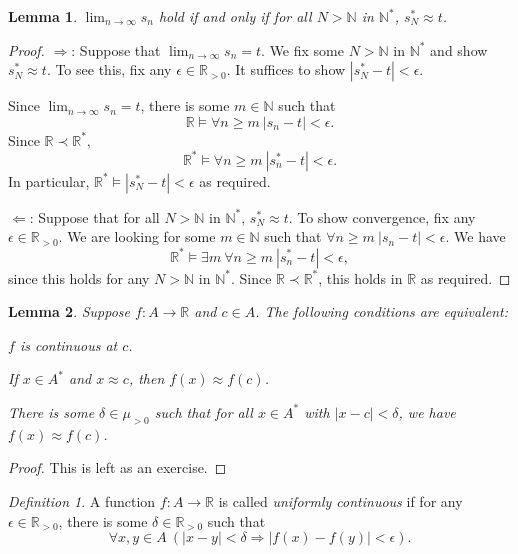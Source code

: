 \documentclass[a4paper, 11pt]{amsart}
\newtheorem{lemma}[lemma]{Lemma}
\theoremstyle{remark}
\newtheorem{definition}[definition]{Definition}
\newcommand{\NN}{\mathbb{N}}
\newcommand{\RR}{\mathbb{R}}
\newenvironment{enumerate-(1)}{\begin{enumerate}[label={\upshape (\arabic*)}, leftmargin=2pc]}{\end{enumerate}}
\begin{document}
\begin{lemma} 
$\lim_{n\rightarrow \infty} s_n$ hold if and only if for all $N>\NN$ in $\NN^*$, $s^*_N\approx t$. 
\end{lemma} 
\begin{proof} 
$\Longrightarrow$: 
Suppose that $\lim_{n\rightarrow \infty} s_n=t$. 
We fix some $N>\NN$ in $\NN^*$ and show $s^*_N\approx t$. 
To see this, fix any $\epsilon \in \RR_{>0}$. 
It suffices to show $|s^*_N-t|<\epsilon$. 

Since $\lim_{n\rightarrow \infty} s_n=t$, there is some $m\in \NN$ such that 
$$ \RR \models \forall n\geq m\ |s_n-t|<\epsilon. $$ 
Since $\RR\prec \RR^*$, 
$$ \RR^* \models \forall n\geq m\ |s^*_n-t|<\epsilon. $$  
In particular, $ \RR^* \models  |s^*_N-t|<\epsilon$ as required. 

$\Longleftarrow$:  
Suppose that for all $N>\NN$ in $\NN^*$, $s^*_N\approx t$. 
To show convergence, fix any $\epsilon \in \RR_{>0}$. 
We are looking for some $m\in \NN$ such that  $ \forall n\geq m\ |s_n -t| <\epsilon $. 
We have 
$$  \RR^* \models  \exists m\ \forall n\geq m\ |s^*_n-t| <\epsilon , $$
since this holds for any $N>\NN$ in $\NN^*$. 
Since $\RR\prec \RR^*$, this holds in $\RR$ as required. 
\end{proof} 


\begin{lemma} 
\label{characterisation of continuity} 
Suppose $f\colon A\rightarrow \RR$ and $c\in A$. 
The following conditions are equivalent: 
\begin{enumerate-(1)} 
\item 
$f$ is continuous at $c$. 
\item 
If $x\in A^*$ and $x \approx c$, then $f(x) \approx f(c)$. 
\item 
There is some $\delta \in \mu_{>0}$ such that for all $x\in A^*$ with $|x-c|<\delta$, we have $f(x) \approx f(c)$. 
\end{enumerate-(1)} 
\end{lemma} 
\begin{proof} 
This is left as an exercise. 
\end{proof} 

\begin{definition} 
A function $f\colon A\rightarrow \RR$ is called \emph{uniformly continuous} if for any $\epsilon \in \RR_{>0}$, there is some $\delta\in \RR_{>0}$ such that 
$$ \forall x,y \in A\ ( |x-y| <\delta  \Longrightarrow |f(x) - f(y)| <\epsilon ) .$$  
\end{definition} 
\end{document}

